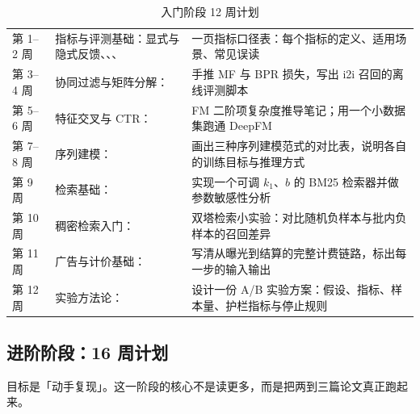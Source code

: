 \begin{table}[htbp]
\centering
\caption{入门阶段 12 周计划}
\label{tab:plan-basic}
\small
\begin{tabularx}{\textwidth}{L{1.4cm} L{3.4cm} Y}
\toprule
{} &  &  \\
\midrule
第 1--2 周 & 指标与评测基础：显式与隐式反馈、、、 &
一页指标口径表：每个指标的定义、适用场景、常见误读 \\
第 3--4 周 & 协同过滤与矩阵分解：\cite{koren2009mf,sarwar2001itemcf,linden2003amazon} &
手推 MF 与 BPR 损失，写出 i2i 召回的离线评测脚本 \\
第 5--6 周 & 特征交叉与 CTR：\cite{rendle2010fm,guo2017deepfm,cheng2016widendeep} &
FM 二阶项复杂度推导笔记；用一个小数据集跑通 DeepFM \\
第 7--8 周 & 序列建模：\cite{kang2018sasrec,sun2019bert4rec,zhou2018din} &
画出三种序列建模范式的对比表，说明各自的训练目标与推理方式 \\
第 9 周 & 检索基础：\cite{robertson2009bm25,manning2008ir} &
实现一个可调 $k_1$、$b$ 的 BM25 检索器并做参数敏感性分析 \\
第 10 周 & 稠密检索入门：\cite{karpukhin2020dpr,reimers2019sbert} &
双塔检索小实验：对比随机负样本与批内负样本的召回差异 \\
第 11 周 & 广告与计价基础：\cite{vickrey1961counterspeculation,edelman2007gsp,he2014practical} &
写清从曝光到结算的完整计费链路，标出每一步的输入输出 \\
第 12 周 & 实验方法论：\cite{kohavi2020trustworthy} &
设计一份 A/B 实验方案：假设、指标、样本量、护栏指标与停止规则 \\
\bottomrule
\end{tabularx}
\end{table}

\subsection{进阶阶段：16 周计划}

目标是「动手复现」。这一阶段的核心不是读更多，而是把两到三篇论文真正跑起来。

